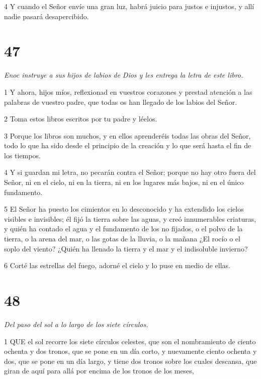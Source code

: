 \par 4 Y cuando el Señor envíe una gran luz, habrá juicio para justos e injustos, y allí nadie pasará desapercibido.

\chapter{47}

\par \textit{Enoc instruye a sus hijos de labios de Dios y les entrega la letra de este libro.}

\par 1 Y ahora, hijos míos, reflexionad en vuestros corazones y prestad atención a las palabras de vuestro padre, que todas os han llegado de los labios del Señor.

\par 2 Toma estos libros escritos por tu padre y léelos.

\par 3 Porque los libros son muchos, y en ellos aprenderéis todas las obras del Señor, todo lo que ha sido desde el principio de la creación y lo que será hasta el fin de los tiempos.

\par 4 Y si guardan mi letra, no pecarán contra el Señor; porque no hay otro fuera del Señor, ni en el cielo, ni en la tierra, ni en los lugares más bajos, ni en el único fundamento.

\par 5 El Señor ha puesto los cimientos en lo desconocido y ha extendido los cielos visibles e invisibles; él fijó la tierra sobre las aguas, y creó innumerables criaturas, y quién ha contado el agua y el fundamento de los no fijados, o el polvo de la tierra, o la arena del mar, o las gotas de la lluvia, o la mañana ¿El rocío o el soplo del viento? ¿Quién ha llenado la tierra y el mar y el indisoluble invierno?

\par 6 Corté las estrellas del fuego, adorné el cielo y lo puse en medio de ellas.

\chapter{48}

\par \textit{Del paso del sol a lo largo de los siete círculos.}

\par 1 QUE el sol recorre los siete círculos celestes, que son el nombramiento de ciento ochenta y dos tronos, que se pone en un día corto, y nuevamente ciento ochenta y dos, que se pone en un día largo, y tiene dos tronos sobre los cuales descansa, que giran de aquí para allá por encima de los tronos de los meses,

